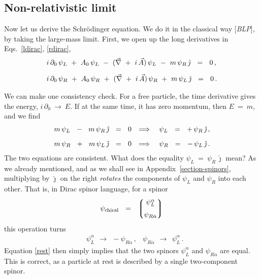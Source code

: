 \documentclass[epsfig,12pt]{article}
\newcommand{\p}{\partial}
\newcommand{\lgr}{\left\lgroup}
\newcommand{\rgr}{\right\rgroup}
\newcommand{\jj}{\hat\jmath}
\begin{document}
\subsection{Non-relativistic limit}

	Now let us derive the Schr\"odinger equation.
	We do it in the classical way [{\it BLP}], by taking the large-mass limit.
	First, we open up the long derivatives in Eqs.~\eqref{ldirac}, \eqref{rdirac},
\begin{align}
%
\notag
	&
	i\,\p_0\,\psi_L  ~+~  A_0\,\psi_L  ~-~  (\vec\nabla ~+~ i\,\vec A)\,\psi_L
	~-~  m\, \psi_R\, \jj	~~=~~	0\,,
	\\[2mm]
%
\label{dirac-split}
	&
	i\,\p_0\,\psi_R  ~+~  A_0\,\psi_R  ~+~  (\vec\nabla ~+~ i\,\vec A)\,\psi_R
	~+~  m\, \psi_L\, \jj  ~~=~~ 0\,.
\end{align}

	We can make one consistency check.
	For a free particle, the time derivative gives the energy,
	$ i\,\p_0 ~\to~ E $.
	If at the same time, it has zero momentum, then $ E ~=~ m $, and
	we find
\begin{align}
%
\notag
	&
	m\,\psi_L  ~~-~~  m\,\psi_R\,\jj	~~=~~	0
	&
	\Longrightarrow\quad \psi_L	~~=~~	+\,\psi_R\,\jj\,,
	\\[2mm]
%
\label{rest}
	&
	m\,\psi_R  ~~+~~  m\,\psi_L\,\jj	~~=~~	0
	&
	\Longrightarrow\quad \psi_R	~~=~~	-\,\psi_L\,\jj\,.
\end{align}
	The two equations are consistent.
	What does the equality $ \psi_L ~=~ \psi_R\,\jj $ mean?
	As we already mentioned, and as we shall see in Appendix~\ref{section-spinors},
	multiplying by $ \jj $ on the right
	\emph{rotates} the components of $ \psi_L $ and $ \psi_R $ into
	each other.
	That is, in Dirac spinor language, for a spinor
\begin{equation}
	\psi_\text{chiral}	~~=~~	\lgr 
						\begin{matrix}
							\psi_L^\alpha	\\[2mm]
							\psi_{R\dot\alpha}
						\end{matrix}
					\rgr
\end{equation}
	this operation turns
\begin{align}
	&
	\psi_L^\alpha	~~\to~~		-\psi_{R\dot\alpha}\,,
	&
	\psi_{R\dot\alpha}	~~\to~~		\psi_L^\alpha\,.
\end{align}
	Equation \eqref{rest} then simply implies that the two spinors
	$ \psi_L^\alpha $ and $ \psi_{R\dot\alpha} $ are equal.
	This is correct, as a particle at rest is described by a single
	two-component spinor.
\end{document}
